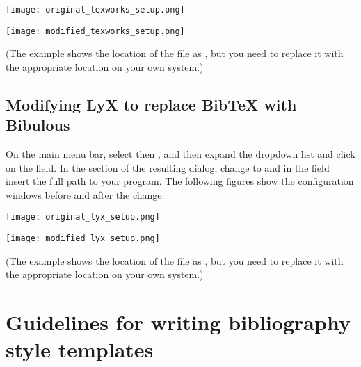 \documentclass[letterpaper,10pt,english]{sphinxmanual}
\begin{document}
\texttt{[image: original\_texworks\_setup.png]}

\texttt{[image: modified\_texworks\_setup.png]}

(The example shows the location of the  file as , but you need to replace it with the appropriate location on your own system.)


\section{Modifying LyX to replace BibTeX with Bibulous}
\label{getting_started:modifying-lyx-to-replace-bibtex-with-bibulous}
On the main menu bar, select  then , and then expand the  dropdown list and click on the  field. In the  section of the resulting dialog, change  to  and in the  field insert the full path to your  program. The following figures show the configuration windows before and after the change:

\texttt{[image: original\_lyx\_setup.png]}

\texttt{[image: modified\_lyx\_setup.png]}

(The example shows the location of the  file as , but you need to replace it with the appropriate location on your own system.)


\chapter{Guidelines for writing bibliography style templates}
\label{guidelines_for_writing_style_templates:guidelines-for-writing-bibliography-style-templates}\label{guidelines_for_writing_style_templates::doc}
\end{document}

